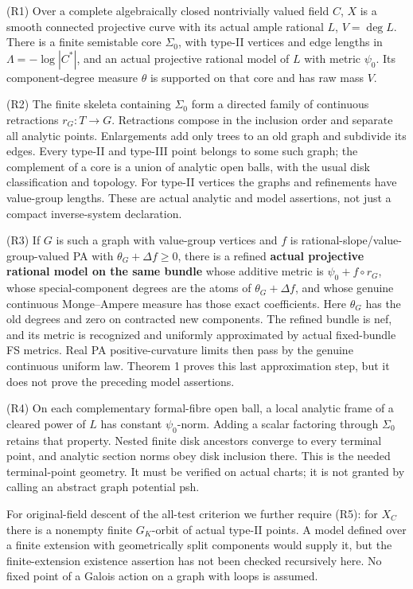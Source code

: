 \documentclass[
  11pt,
]{article}
\begin{document}
(R1) Over a complete algebraically closed nontrivially valued field
\(C\), \(X\) is a smooth connected projective curve with its actual
ample rational \(L\), \(V=\deg L\). There is a finite semistable core
\(\Sigma_0\), with type-II vertices and edge lengths in
\(\Lambda=-\log|C^*|\), and an actual projective rational model of \(L\)
with metric \(\psi_0\). Its component-degree measure \(\theta\) is
supported on that core and has raw mass \(V\).

(R2) The finite skeleta containing \(\Sigma_0\) form a directed family
of continuous retractions \(r_G:T\to G\). Retractions compose in the
inclusion order and separate all analytic points. Enlargements add only
trees to an old graph and subdivide its edges. Every type-II and
type-III point belongs to some such graph; the complement of a core is a
union of analytic open balls, with the usual disk classification and
topology. For type-II vertices the graphs and refinements have
value-group lengths. These are actual analytic and model assertions, not
just a compact inverse-system declaration.

(R3) If \(G\) is such a graph with value-group vertices and \(f\) is
rational-slope/value-group-valued PA with \(\theta_G+\Delta f\geq0\),
there is a refined \textbf{actual projective rational model on the same
bundle} whose additive metric is \(\psi_0+f\circ r_G\), whose
special-component degrees are the atoms of \(\theta_G+\Delta f\), and
whose genuine continuous Monge--Ampere measure has those exact
coefficients. Here \(\theta_G\) has the old degrees and zero on
contracted new components. The refined bundle is nef, and its metric is
recognized and uniformly approximated by actual fixed-bundle FS metrics.
Real PA positive-curvature limits then pass by the genuine continuous
uniform law. Theorem 1 proves this last approximation step, but it does
not prove the preceding model assertions.

(R4) On each complementary formal-fibre open ball, a local analytic
frame of a cleared power of \(L\) has constant \(\psi_0\)-norm. Adding a
scalar factoring through \(\Sigma_0\) retains that property. Nested
finite disk ancestors converge to every terminal point, and analytic
section norms obey disk inclusion there. This is the needed
terminal-point geometry. It must be verified on actual charts; it is not
granted by calling an abstract graph potential psh.

For original-field descent of the all-test criterion we further require
(R5): for \(X_C\) there is a nonempty finite \(G_K\)-orbit of actual
type-II points. A model defined over a finite extension with
geometrically split components would supply it, but the finite-extension
existence assertion has not been checked recursively here. No fixed
point of a Galois action on a graph with loops is assumed.
\end{document}
